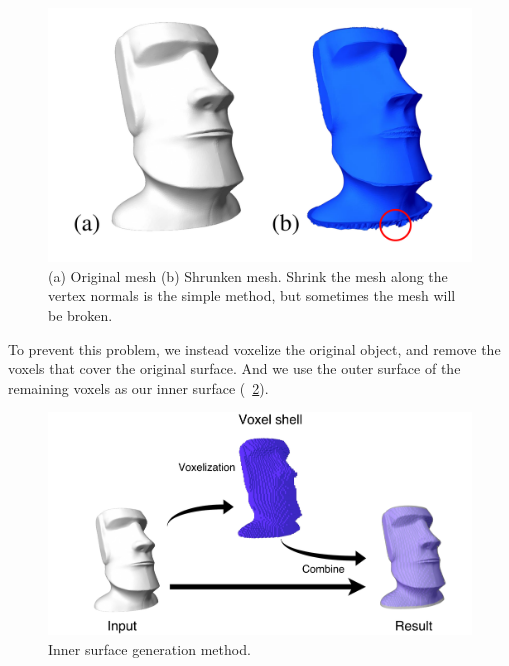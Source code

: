 \begin{figure}[ht]
\centering
\includegraphics[width=1.0\linewidth]{figs/Shrink_mesh.pdf} 
\caption{
(a) Original mesh (b) Shrunken mesh. Shrink the mesh along the vertex normals is the simple method, but sometimes the mesh will be broken.}
\label{fig:shrink_mesh}
\end{figure}
To prevent this problem, we instead voxelize the original object, and remove the voxels that cover the original surface.
And we use the outer surface of the remaining voxels as our inner surface (\figname~\ref{fig:inner_surface}).

\begin{figure}[ht]
\centering
\includegraphics[width=1.0\linewidth]{figs/inner2.pdf} 
\caption{Inner surface generation method.}
\label{fig:inner_surface}
\end{figure}

